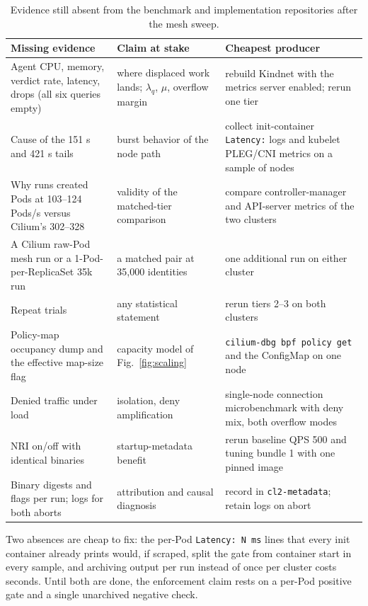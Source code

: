 \begin{table}[t]
\centering
\footnotesize
\setlength{\tabcolsep}{4pt}
\begin{tabular}{R{2.35cm}R{2.15cm}R{2.85cm}}
\toprule
Missing evidence & Claim at stake & Cheapest producer\\
\midrule
Agent CPU, memory, verdict rate, latency, drops (all six queries empty) & where displaced work lands; $\lambda_q$, $\mu$, overflow margin & rebuild Kindnet with the metrics server enabled; rerun one tier\\
\addlinespace
Cause of the \sys{} 151 s and 421 s tails & burst behavior of the \sys{} node path & collect init-container \texttt{Latency:} logs and kubelet PLEG/CNI metrics on a sample of nodes\\
\addlinespace
Why \sys{} runs created Pods at 103--124 Pods/s versus Cilium's 302--328 & validity of the matched-tier comparison & compare controller-manager and API-server metrics of the two clusters\\
\addlinespace
A Cilium raw-Pod mesh run or a \sys{} 1-Pod-per-ReplicaSet 35k run & a matched pair at 35,000 identities & one additional run on either cluster\\
\addlinespace
Repeat trials & any statistical statement & rerun tiers 2--3 on both clusters\\
\addlinespace
Policy-map occupancy dump and the effective map-size flag & capacity model of Fig.~\ref{fig:scaling} & \texttt{cilium-dbg bpf policy get} and the ConfigMap on one node\\
\addlinespace
Denied traffic under load & isolation, deny amplification & single-node connection microbenchmark with deny mix, both overflow modes\\
\addlinespace
NRI on/off with identical binaries & startup-metadata benefit & rerun baseline QPS 500 and tuning bundle 1 with one pinned image\\
\addlinespace
Binary digests and flags per run; logs for both aborts & attribution and causal diagnosis & record in \texttt{cl2-metadata}; retain logs on abort\\
\bottomrule
\end{tabular}
\caption{Evidence still absent from the benchmark and implementation
repositories after the \sys{} mesh sweep.}
\label{tab:gaps}
\end{table}

Two absences are cheap to fix: the per-Pod \texttt{Latency: N ms} lines
that every init container already prints would, if scraped, split the
gate from container start in every sample, and archiving
 output per run instead of once per
cluster costs seconds. Until both are done, the enforcement claim rests
on a per-Pod positive gate and a single unarchived negative check.
